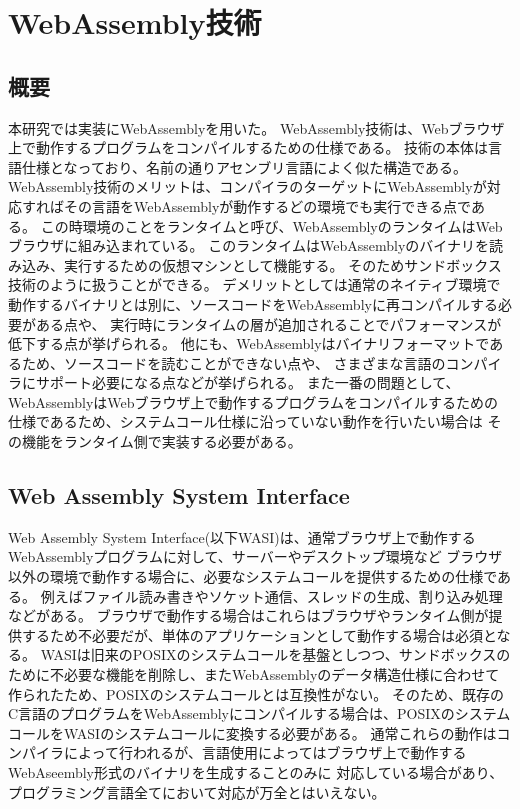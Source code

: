 \documentclass[a4paper,11pt]{jreport}
\begin{document}
\chapter{WebAssembly技術}

\section{概要}

本研究では実装にWebAssemblyを用いた。
WebAssembly技術は、Webブラウザ上で動作するプログラムをコンパイルするための仕様である。
技術の本体は言語仕様となっており、名前の通りアセンブリ言語によく似た構造である。
WebAssembly技術のメリットは、コンパイラのターゲットにWebAssemblyが対応すればその言語をWebAssemblyが動作するどの環境でも実行できる点である。
この時環境のことをランタイムと呼び、WebAssemblyのランタイムはWebブラウザに組み込まれている。
このランタイムはWebAssemblyのバイナリを読み込み、実行するための仮想マシンとして機能する。
そのためサンドボックス技術のように扱うことができる。
デメリットとしては通常のネイティブ環境で動作するバイナリとは別に、ソースコードをWebAssemblyに再コンパイルする必要がある点や、
実行時にランタイムの層が追加されることでパフォーマンスが低下する点が挙げられる。
他にも、WebAssemblyはバイナリフォーマットであるため、ソースコードを読むことができない点や、
さまざまな言語のコンパイラにサポート必要になる点などが挙げられる。
また一番の問題として、WebAssemblyはWebブラウザ上で動作するプログラムをコンパイルするための仕様であるため、システムコール仕様に沿っていない動作を行いたい場合は
その機能をランタイム側で実装する必要がある。

\section{Web Assembly System Interface}

Web Assembly System Interface(以下WASI)\cite{wasi}は、通常ブラウザ上で動作するWebAssemblyプログラムに対して、サーバーやデスクトップ環境など
ブラウザ以外の環境で動作する場合に、必要なシステムコールを提供するための仕様である。
例えばファイル読み書きやソケット通信、スレッドの生成、割り込み処理などがある。
ブラウザで動作する場合はこれらはブラウザやランタイム側が提供するため不必要だが、単体のアプリケーションとして動作する場合は必須となる。
WASIは旧来のPOSIXのシステムコールを基盤としつつ、サンドボックスのために不必要な機能を削除し、またWebAssemblyのデータ構造仕様に合わせて
作られたため、POSIXのシステムコールとは互換性がない。
そのため、既存のC言語のプログラムをWebAssemblyにコンパイルする場合は、POSIXのシステムコールをWASIのシステムコールに変換する必要がある。
通常これらの動作はコンパイラによって行われるが、言語使用によってはブラウザ上で動作するWebAseembly形式のバイナリを生成することのみに
対応している場合があり、プログラミング言語全てにおいて対応が万全とはいえない。
\end{document}
